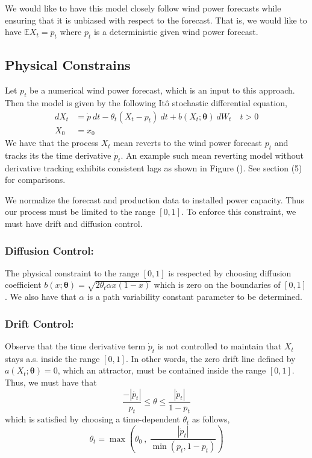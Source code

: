 \documentclass[10pt,twocolumn,letterpaper]{article}
\newcommand{\E}{\mathbb{E}}
\begin{document}
We would like to have this model closely follow wind power forecasts while ensuring that it is unbiased with respect to the forecast. That is, we would like to have $\E X_t = p_t$ where $p_t$ is a deterministic given wind power forecast.

\subsection{Physical Constrains}

Let $p_t$ be a numerical wind power forecast, which is an input to this approach. Then the model is given by the following It\^{o} stochastic differential equation,
\begin{equation}
\begin{split}
dX_t&= \dot{p} \ dt - \theta_t(X_t - p_t) \ dt + b (X_t; \bm{\theta} ) \ dW_t \quad t > 0 \\
X_0&=x_0
\end{split}
\label{model:derivative_tracking_X}
\end{equation}
We have that the process $X_t$ mean reverts to the wind power forecast $p_t$ and tracks its the time derivative $\dot{p}_t$.  An example such mean reverting model without derivative tracking exhibits consistent lags as shown in Figure (). See section (5) for comparisons.

 We normalize the forecast and production data to installed power capacity. Thus our process must be limited to the range $[0,1]$. To enforce this constraint, we must have drift and diffusion control.
\subsubsection*{Diffusion Control: } The physical constraint to the range $[0,1]$ is respected  by choosing  diffusion coefficient $ b (x; \bm{\theta} )= \sqrt{2 \theta_t \alpha x (1-x)} $ which is zero on the boundaries of $[0,1]$. We also have that $\alpha$ is a path variability constant parameter to be determined.

\subsubsection*{Drift Control: }
Observe that the time derivative term $\dot{p}_t $ is not controlled to maintain that $X_t$ stays a.s.  inside the range $[0,1]$. In other words, the zero drift line defined by $a(X_t; \bm{\theta}) =0$, which an attractor, must be contained inside the range $[0,1]$. Thus, we must have that
\begin{equation}
\frac{- |\dot{p_t}|}{p_t} \leq \theta \leq \frac{|\dot{p}_t|}{1- p_t}
\end{equation}
which is satisfied  by choosing a time-dependent  $\theta_t$ as follows,
\begin{equation}
\theta_t = \max \left( \theta_0 \ , \ \frac{|\dot{p}_t|}{\min (p_t, 1-p_t)}  \right ) \label{theta_t}
\end{equation}
\end{document}
